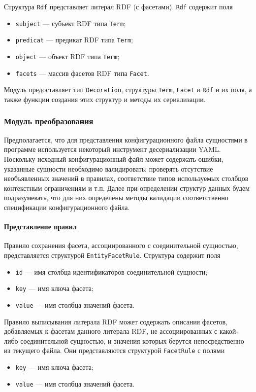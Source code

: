 Структура \texttt{Rdf} представляет литерал RDF (с фасетами). \texttt{Rdf} содержит поля
\begin{itemize}
  \item \texttt{subject} --- субъект RDF типа \texttt{Term};
  \item \texttt{predicat} --- предикат RDF типа \texttt{Term};
  \item \texttt{object} --- объект RDF типа \texttt{Term};
  \item \texttt{facets} --- массив фасетов RDF типа \texttt{Facet}.
\end{itemize}

Модуль предоставляет тип \texttt{Decoration}, структуры \texttt{Term}, \texttt{Facet} и \texttt{Rdf} и их поля, а также
функции создания этих структур и методы их сериализации.

\subsubsection{Модуль преобразования}

Предполагается, что для представления конфигурационного файла сущностями в программе используется некоторый инструмент
десериализации YAML. Поскольку исходный конфигурационный файл может содержать ошибки, указанные сущности необходимо
валидировать: проверять отсутствие необъявленных значений в правилах, соответствие типов используемых столбцов
контекстным ограничениям и т.п. Далее при определении структур данных будем подразумевать, что для них определены методы
валидации соответственно спецификации конфигурационного файла.

\paragraph{Представление правил}

Правило сохранения фасета, ассоциированного с соединительной сущностью, представляется структурой
\texttt{EntityFacetRule}. Структура содержит поля
\begin{itemize}
  \item \texttt{id} --- имя столбца идентификаторов соединительной сущности;
  \item \texttt{key} --- имя ключа фасета;
  \item \texttt{value} --- имя столбца значений фасета.
\end{itemize}

Правило выписывания литерала RDF может содержать описания фасетов, добавляемых к фасетам данного литерала RDF, не
ассоциированных с какой-либо соединительной сущностью, и значения которых берутся непосредственно из текущего файла.
Они представляются структурой \texttt{FacetRule} с полями
\begin{itemize}
  \item \texttt{key} --- имя ключа фасета;
  \item \texttt{value} --- имя столбца значений фасета.
\end{itemize}

